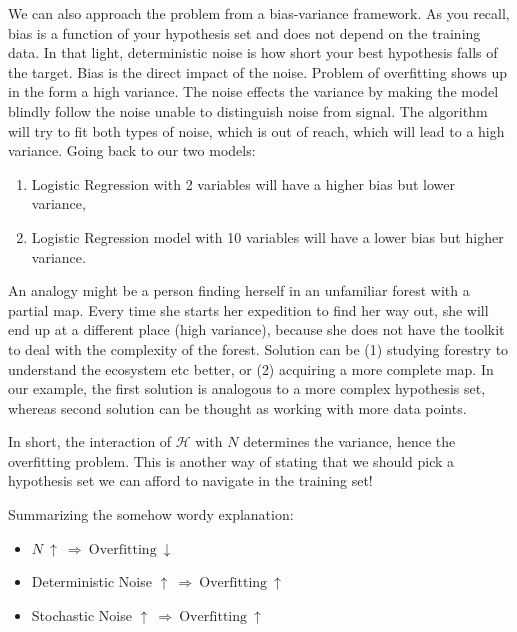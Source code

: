 \documentclass[10pt]{article}
\numberwithin{equation}{section}  %
\begin{document}
We can also approach the problem from a bias-variance framework. As you recall, bias is a function of your hypothesis set and does not depend on the training data. In that light, deterministic noise is how short your best hypothesis falls of the target. Bias is the direct impact of the noise. Problem of overfitting shows up in the form a high variance. The noise effects the variance by making the model blindly follow the noise unable to distinguish noise from signal. The algorithm will try to fit both types of noise, which is out of reach, which will lead to a high variance.
Going back to our two models:
\begin{enumerate}
    \item Logistic Regression with 2 variables will have a higher bias but lower variance,
    \item Logistic Regression model with 10 variables will have a lower bias but higher variance.
\end{enumerate}


An analogy might be a person finding herself in an unfamiliar forest with a partial map. Every time she starts her expedition to find her way out, she will end up at a different place (high variance), because she does not have the toolkit to deal with the complexity of the forest. Solution can be (1) studying forestry to understand the ecosystem etc better, or (2) acquiring a more complete map. In our example, the first solution is analogous to a more complex hypothesis set, whereas second solution can be thought as working with more data points.

In short, the interaction of $\mathcal{H}$ with $N$ determines the variance, hence the overfitting problem. This is another way of stating that we should pick a hypothesis set we can afford to navigate in the training set!

Summarizing the somehow wordy explanation:
\begin{itemize}
    \item $N\ \uparrow\ \Longrightarrow\ \mathrm{Overfitting}\ \downarrow$
    \item Deterministic Noise $\uparrow\ \Longrightarrow\ \mathrm{Overfitting}\ \uparrow$
    \item Stochastic Noise $\uparrow\ \Longrightarrow\ \mathrm{Overfitting}\ \uparrow$
\end{itemize}
\end{document}
